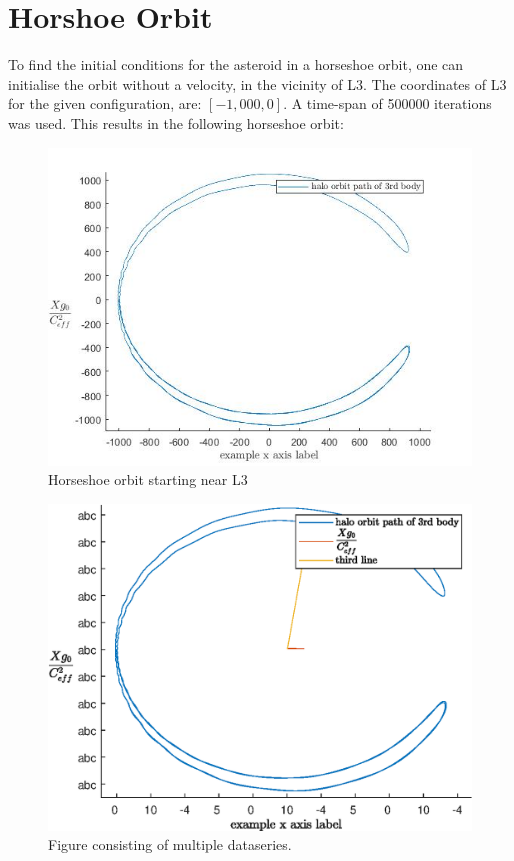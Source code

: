 \section{Horshoe Orbit}\label{sec:1d}
To find the initial conditions for the asteroid in a horseshoe orbit, one can initialise the orbit without a velocity, in the vicinity of L3. The coordinates of L3 for the given configuration, are: $[-1,000, 0]$\cite{lecture_notes}.
A time-span of 500000 iterations was used. This results in the following horseshoe orbit:
\begin{figure}[H]
    \centering
    \includegraphics[width=1\textwidth]{Images/plot_1d.jpg}
    \caption{Horseshoe orbit starting near L3}
\end{figure}

\begin{figure}[H]
    \centering
    \includegraphics[width=1\textwidth]{Images/plot_1d.eps}
    \caption{Figure consisting of multiple dataseries.}
\end{figure}